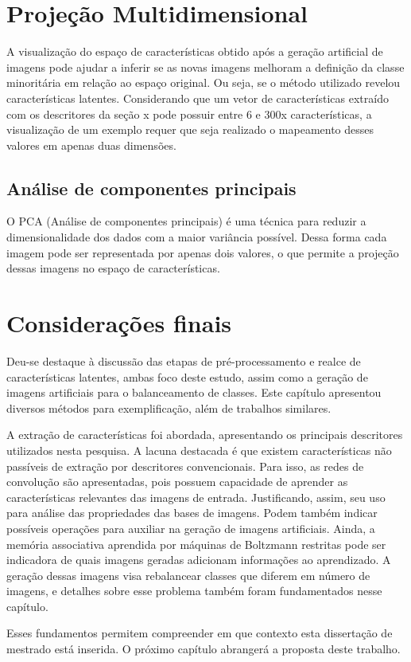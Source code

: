 \section{Projeção Multidimensional}
\label{cap:vis}

A visualização do espaço de características obtido após a geração artificial de imagens pode ajudar a inferir se as novas imagens melhoram a definição da classe minoritária em relação ao espaço original. Ou seja, se o método utilizado revelou características latentes.
Considerando que um vetor de características extraído com os descritores da seção x pode possuir entre 6 e 300x características, a visualização de um exemplo requer que seja realizado o mapeamento desses valores em apenas duas dimensões.


\subsection{Análise de componentes principais}

O PCA (Análise de componentes principais) é uma técnica para reduzir a dimensionalidade dos dados com a maior variância possível. Dessa forma cada imagem pode ser representada por apenas dois valores, o que permite a projeção dessas imagens no espaço de características.



\section{Considerações finais}

Deu-se destaque à discussão das etapas de pré-processamento e realce de características latentes, ambas foco deste estudo, assim como a geração de imagens artificiais para o balanceamento de classes. Este capítulo apresentou diversos métodos para exemplificação, além de trabalhos similares.

A extração de características foi abordada, apresentando os principais descritores utilizados nesta pesquisa. A lacuna destacada é que existem características não passíveis de extração por descritores convencionais. Para isso, as redes de convolução são apresentadas, pois possuem capacidade de aprender as características relevantes das imagens de entrada. Justificando, assim, seu uso para análise das propriedades das bases de imagens. Podem também indicar possíveis operações para auxiliar na geração de imagens artificiais. Ainda, a memória associativa aprendida por máquinas de Boltzmann restritas pode ser indicadora de quais imagens geradas adicionam informações ao aprendizado. A geração dessas imagens visa rebalancear classes que diferem em número de imagens, e detalhes sobre esse problema também foram fundamentados nesse capítulo.

Esses fundamentos permitem compreender em que contexto esta dissertação de mestrado está inserida. O próximo capítulo abrangerá a proposta deste trabalho.

